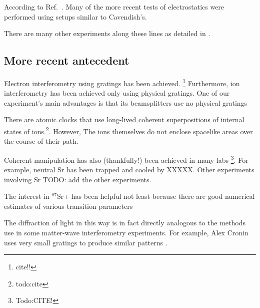 According to Ref.\ \cite{jackson}. Many of the more recent tests of electrostatics were performed using setups similar to Cavendish's. 

There are many other experiments along these lines as detailed in \cite{PhotonMassSurvey}. 

\subsection{More recent antecedent}
Electron interferometry using gratings has been achieved. \footnote{cite!!} Furthermore, ion interferometry has been achieved only using physical gratings. One of our experiment's main advantages is that its beamsplitters use no physical gratings

There are atomic clocks that use long-lived coherent superpositions of internal states of ions.\footnote{todo:cite}. However, The ions themselves do not enclose spacelike areas over the course of their path.

Coherent manipulation has also (thankfully!) been achieved in many labs \footnote{Todo:CITE!}. For example, neutral Sr has been trapped and cooled by XXXXX. 
Other experiments involving Sr TODO: add the other experiments.

The interest in $^{87}$Sr+ has been helpful not least because there are good numerical estimates of various transition parameters \cite{safronovaTheory}

The diffraction of light in this way is in fact directly analogous to the methods use in some matter-wave interferometry experiments. For example, Alex Cronin uses very small gratings to produce similar patterns \cite{Kronin_RMP}. 

